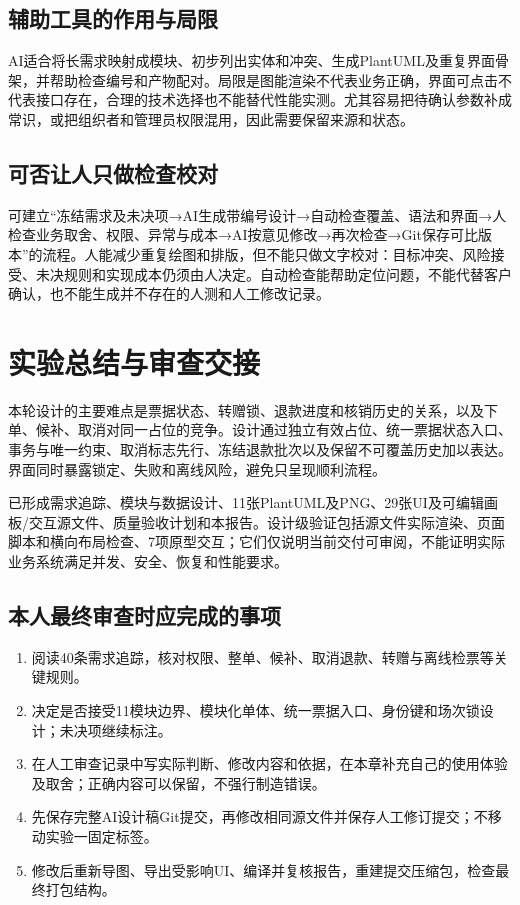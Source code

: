 \documentclass[UTF8,zihao=-4,fontset=windows]{ctexart}
\begin{document}
\subsection{辅助工具的作用与局限}
AI适合将长需求映射成模块、初步列出实体和冲突、生成PlantUML及重复界面骨架，并帮助检查编号和产物配对。局限是图能渲染不代表业务正确，界面可点击不代表接口存在，合理的技术选择也不能替代性能实测。尤其容易把待确认参数补成常识，或把组织者和管理员权限混用，因此需要保留来源和状态。


\subsection{可否让人只做检查校对}
可建立“冻结需求及未决项→AI生成带编号设计→自动检查覆盖、语法和界面→人检查业务取舍、权限、异常与成本→AI按意见修改→再次检查→Git保存可比版本”的流程。人能减少重复绘图和排版，但不能只做文字校对：目标冲突、风险接受、未决规则和实现成本仍须由人决定。自动检查能帮助定位问题，不能代替客户确认，也不能生成并不存在的人测和人工修改记录。


\clearpage

\section{实验总结与审查交接}
本轮设计的主要难点是票据状态、转赠锁、退款进度和核销历史的关系，以及下单、候补、取消对同一占位的竞争。设计通过独立有效占位、统一票据状态入口、事务与唯一约束、取消标志先行、冻结退款批次以及保留不可覆盖历史加以表达。界面同时暴露锁定、失败和离线风险，避免只呈现顺利流程。

已形成需求追踪、模块与数据设计、11张PlantUML及PNG、29张UI及可编辑画板/交互源文件、质量验收计划和本报告。设计级验证包括源文件实际渲染、页面脚本和横向布局检查、7项原型交互；它们仅说明当前交付可审阅，不能证明实际业务系统满足并发、安全、恢复和性能要求。


\subsection{本人最终审查时应完成的事项}
\begin{enumerate}
\item 阅读40条需求追踪，核对权限、整单、候补、取消退款、转赠与离线检票等关键规则。
\item 决定是否接受11模块边界、模块化单体、统一票据入口、身份键和场次锁设计；未决项继续标注。
\item 在人工审查记录中写实际判断、修改内容和依据，在本章补充自己的使用体验及取舍；正确内容可以保留，不强行制造错误。
\item 先保存完整AI设计稿Git提交，再修改相同源文件并保存人工修订提交；不移动实验一固定标签。
\item 修改后重新导图、导出受影响UI、编译并复核报告，重建提交压缩包，检查最终打包结构。
\end{enumerate}
\end{document}
